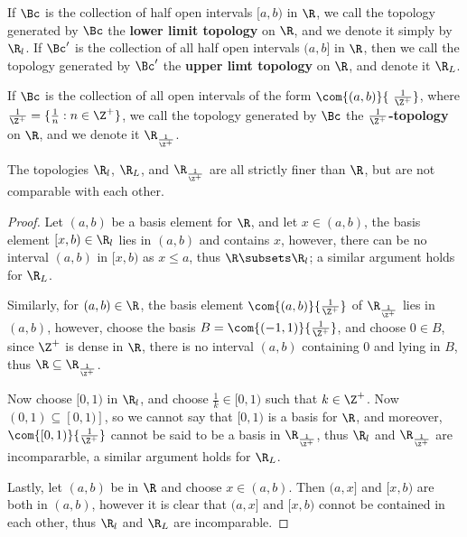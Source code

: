 \begin{definition}
    If $\Bc$ is the collection of half open intervals  $[a,b)$ in  $\R$, we call the
    topology generated by  $\Bc$ the \textbf{lower limit topology} on $\R$, and we
    denote it simply by  $\R_l$. If $\Bc'$ is the collection of all half open intervals  $(a,b]$
    in  $\R$, then we call the topology generated by  $\Bc'$ the \textbf{upper limt topology}
    on $\R$, and denote it  $\R_L$.
\end{definition}

\begin{definition}
    If $\Bc$ is the collection of all open intervals of the form  $\com{(a,b)}{\ \frac{1}{\Z^+}}$,
    where $\frac{1}{\Z^+}=\{\frac{1}{n}: n \in \Z^+\}$, we call the topology generated by $\Bc$ the
    \textbf{$\frac{1}{\Z^+}$-topology} on $\R$, and we denote it  $\R_{\frac{1}{\Z^+}}$.
\end{definition}

\begin{lemma}\label{1.2.4}
    The topologies $\R_l$,  $\R_L$, and  $\R_{\frac{1}{\Z^+}}$ are all strictly finer than $\R$,
    but are not comparable with each other.
\end{lemma}
\begin{proof}
    Let $(a,b)$ be a basis element for  $\R$, and let  $x \in (a,b)$, the basis element $[x,b) \in \R_l$
    lies in $(a,b)$ and contains $x$, however, there can be no interval  $(a,b)$ in  $[x,b)$ as
     $x \leq a$, thus  $\R \subsets \R_l$; a similar argument holds for  $\R_L$.

     Similarly, for  $(a,b) \in \R$, the basis element  $\com{(a,b)}{ \frac{1}{\Z^+}}$ of $\R_{\frac{1}{\Z^+}}$
     lies in $(a,b)$, however, choose the basis $B=\com{(-1,1)}{\frac{1}{\Z^+}}$, and
     choose $0 \in B$, since  $\Z^+$ is dense in  $\R$, there is no interval  $(a,b)$ containing  $0$
     and lying in  $B$, thus  $\R \subseteq \R_{\frac{1}{\Z^+}}$.

     Now choose $[0,1)$ in  $\R_l$, and choose  $ \frac{1}{k} \in [0,1)$ such that $k \in \Z^+$. Now
     $(0,1) \subseteq [0,1)]$, so we cannot say that $[0,1)$ is a basis for  $\R$, and moreover,
     $\com{[0,1)}{\frac{1}{\Z^+}}$ cannot be said to be a basis in $\R_{\frac{1}{\Z^+}}$, thus
     $\R_l$ and  $\R_{\frac{1}{\Z^+}}$ are incompararble, a similar argument holds for $\R_L$.

     Lastly, let  $(a,b)$ be in  $\R$ and choose  $x \in (a,b)$. Then $(a,x]$ and  $[x,b)$ are
     both in  $(a,b)$, however it is clear that  $(a,x]$ and  $[x,b)$ connot be contained in each other,
     thus $\R_l$ and  $\R_L$ are incomparable.
\end{proof}

